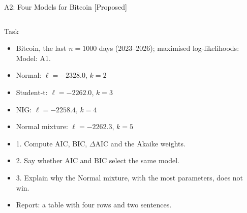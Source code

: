 \begin{frame}{A2: Four Models for Bitcoin [Proposed]}
\propsub
\itemsize{\scriptsize}
\begin{columns}[T]
\begin{column}{\taskw}
\begin{block}{Task}
\begin{itemize}
    \item Bitcoin, the last $n = 1000$ days (2023--2026); maximised log-likelihoods: Model: A1.
    \item Normal: $\ell = -2328.0$, $k = 2$
    \item Student-t: $\ell = -2262.0$, $k = 3$
    \item NIG: $\ell = -2258.4$, $k = 4$
    \item Normal mixture: $\ell = -2262.3$, $k = 5$
    \item 1. Compute AIC, BIC, $\Delta$AIC and the Akaike weights.
    \item 2. Say whether AIC and BIC select the same model.
    \item 3. Explain why the Normal mixture, with the most parameters, does not win.
    \item Report: a table with four rows and two sentences.
\end{itemize}
\end{block}
\end{column}
\begin{column}{\solw}
\end{column}
\end{columns}
\end{frame}

